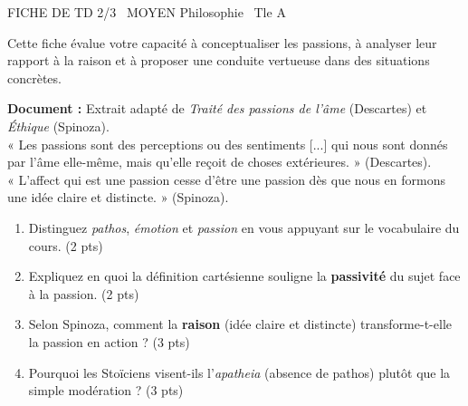 \documentclass[11pt]{article}
\begin{document}
\begin{tcolorbox}[enhanced,colback=popink,colframe=popink,arc=10pt,boxrule=0pt,left=12pt,right=12pt,top=9pt,bottom=9pt]
{\color{white}\popxbold\small FICHE DE TD 2/3 \textbullet\ MOYEN \hfill Philosophie \textbullet\ Tle A\par}
\end{tcolorbox}
\vspace{4pt}
Cette fiche évalue votre capacité à conceptualiser les passions, à analyser leur rapport à la raison et à proposer une conduite vertueuse dans des situations concrètes.

\begin{exercice}
\textbf{Document :} Extrait adapté de \textit{Traité des passions de l'âme} (Descartes) et \textit{Éthique} (Spinoza).\\
« Les passions sont des perceptions ou des sentiments [...] qui nous sont donnés par l'âme elle-même, mais qu'elle reçoit de choses extérieures. » (Descartes).\\
« L'affect qui est une passion cesse d'être une passion dès que nous en formons une idée claire et distincte. » (Spinoza).
\begin{enumerate}
    \item Distinguez \textit{pathos}, \textit{émotion} et \textit{passion} en vous appuyant sur le vocabulaire du cours. (2 pts)
    \item Expliquez en quoi la définition cartésienne souligne la \textbf{passivité} du sujet face à la passion. (2 pts)
    \item Selon Spinoza, comment la \textbf{raison} (idée claire et distincte) transforme-t-elle la passion en action ? (3 pts)
    \item Pourquoi les Stoïciens visent-ils l'\textit{apatheia} (absence de pathos) plutôt que la simple modération ? (3 pts)
\end{enumerate}
\end{exercice}
\end{document}
